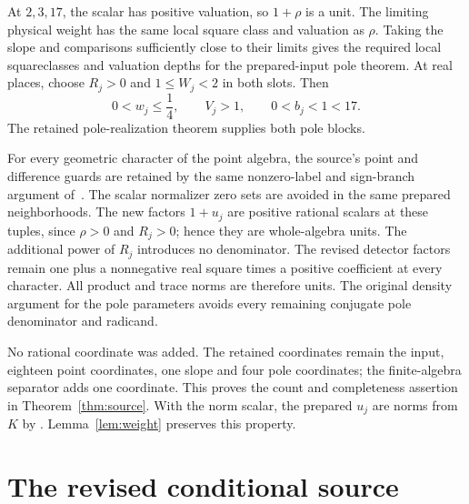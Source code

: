 \documentclass[11pt,a4paper]{article}
\begin{document}
At $2,3,17$, the scalar has positive valuation, so $1+\rho$ is a unit.
The limiting physical weight has the same local square class and
valuation as $\rho$. Taking the slope and comparisons sufficiently
close to their limits gives the required local squareclasses and
valuation depths for the prepared-input pole theorem. At real places,
choose $R_j>0$ and $1\le W_j<2$ in both slots. Then
\[
                    0<w_j\le\frac14,\qquad
                    V_j>1,\qquad 0<b_j<1<17.
\]
The retained pole-realization theorem supplies both pole blocks.

For every geometric character of the point algebra, the source's point
and difference guards are retained by the same nonzero-label and
sign-branch argument of~\cite[Section 5]{Unit}. The scalar normalizer
zero sets are avoided in the same prepared neighborhoods. The new
factors $1+u_j$ are positive rational scalars at these tuples, since
$\rho>0$ and $R_j>0$; hence they are whole-algebra units.
The additional power of $R_j$ introduces no denominator.
The revised detector factors remain one plus a nonnegative real square
times a positive coefficient at every character. All product and trace
norms are therefore units. The original density argument for the pole
parameters avoids every remaining conjugate pole denominator and
radicand.

No rational coordinate was added. The retained coordinates remain the
input, eighteen point coordinates, one slope and four pole coordinates;
the finite-algebra separator adds one coordinate. This proves the
count and completeness assertion in Theorem~\ref{thm:source}.
With the norm scalar, the prepared $u_j$ are norms from $K$ by
\cite{Aligned}. Lemma~\ref{lem:weight} preserves this property.

\section{The revised conditional source}
\end{document}
